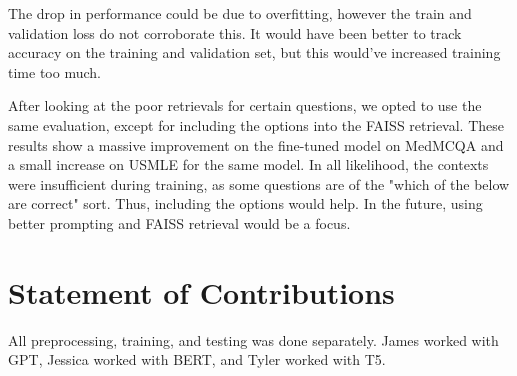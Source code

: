 \documentclass{article}
\begin{document}
The drop in performance could be due to overfitting, however the train and validation loss do not corroborate this. It would have been better to track accuracy on the training and validation set, but this would've increased training time too much.

After looking at the poor retrievals for certain questions, we opted to use the same evaluation, except for including the options into the FAISS retrieval. These results show a massive improvement on the fine-tuned model on MedMCQA and a small increase on USMLE for the same model. In all likelihood, the contexts were insufficient during training, as some questions are of the "which of the below are correct" sort. Thus, including the options would help. In the future, using better prompting and FAISS retrieval would be a focus.

\section{Statement of Contributions}

All preprocessing, training, and testing was done separately. James worked with GPT, Jessica worked with BERT, and Tyler worked with T5.


\end{document}
